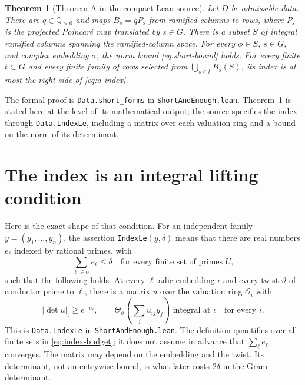 \documentclass[11pt,oneside,openany]{amsbook}
\newtheorem{theorem}{Theorem}[section]
\theoremstyle{remark}
\numberwithin{equation}{section}
\newcommand{\Q}{\mathbb Q}
\newcommand{\ghroot}{https://github.com/lsernau/grh-lean/blob/}
\newcommand{\ghrev}{72fead102f663d5c7a407964a13dc0cf9d977207}
\newcommand{\leanfile}[2]{%
  \href{\ghroot\ghrev/grh-compact/src/#1}{\nolinkurl{#2}}}
\begin{document}
\begin{theorem}[Theorem A in the compact Lean source]
\label{thm:a}
Let $D$ be admissible data. There are $q\in\Q_{>0}$ and
maps $B_s=qP_s$ from ramified columns to rows, where $P_s$
is the projected Poincar\'e map translated by $s\in G$.
There is a subset $S$ of integral ramified columns spanning
the ramified-column space. For every $\phi\in S$, $s\in G$,
and complex embedding $\sigma$, the norm bound
\eqref{eq:short-bound} holds. For every finite $t\subset G$
and every finite family of rows selected from
$\bigcup_{s\in t}B_s(S)$, its index is at most the right
side of \eqref{eq:a-index}.
\end{theorem}
The formal proof is \texttt{Data.short\_forms} in
\leanfile{New/Endgame/ShortAndEnough.lean}{ShortAndEnough.lean}.
Theorem~\ref{thm:a} is stated here at the level of its
mathematical output; the source specifies the index through
\texttt{Data.IndexLe}, including a matrix over each valuation
ring and a bound on the norm of its determinant.

\section{The index is an integral lifting condition}
\label{sec:index-definition}
Here is the exact shape of that condition. For an
independent family $y=(y_1,\ldots,y_n)$, the assertion
\texttt{IndexLe}$(y,\delta)$ means that there are real
numbers $e_\ell$ indexed by rational primes, with
\begin{equation}
\label{eq:index-budget}
\sum_{\ell\in U}e_\ell\le\delta
\quad\text{for every finite set of primes }U,
\end{equation}
such that the following holds. At every $\ell$-adic
embedding $\iota$ and every twist $\vartheta$ of conductor
prime to $\ell$, there is a matrix $u$ over the valuation
ring $\mathcal O_\iota$ with
\begin{equation}
\label{eq:index-matrix}
|\det u|_\iota\ge e^{-e_\ell},\qquad
\Theta_\vartheta\!\left(\sum_j u_{ij}y_j\right)
\text{ integral at }\iota\quad\text{for every }i.
\end{equation}
This is \texttt{Data.IndexLe} in
\leanfile{New/Endgame/ShortAndEnough.lean}%
{ShortAndEnough.lean}. The definition quantifies over
all finite sets in \eqref{eq:index-budget}; it does not
assume in advance that $\sum_\ell e_\ell$ converges.
The matrix may depend on the embedding and the twist.
Its determinant, not an entrywise bound, is what later
costs $2\delta$ in the Gram determinant.
\end{document}
